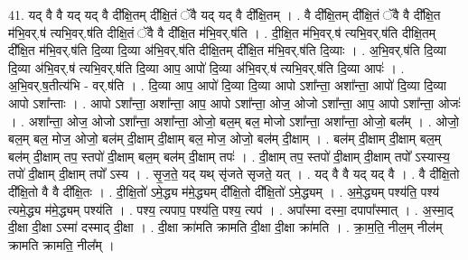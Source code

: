 \documentclass[17pt]{extarticle}
\begin{document}
41. यद् वै वै यद् यद् वै दी᳚क्षि॒तम् दी᳚क्षि॒तं ॅवै यद् यद् वै दी᳚क्षि॒तम् । . वै दी᳚क्षि॒तम् दी᳚क्षि॒तं ॅवै वै दी᳚क्षि॒त म॑भि॒वर्.ष॑ त्यभि॒वर्.ष॑ति दीक्षि॒तं ॅवै वै दी᳚क्षि॒त म॑भि॒वर्.ष॑ति । . दी॒क्षि॒त म॑भि॒वर्.ष॑ त्यभि॒वर्.ष॑ति दीक्षि॒तम् दी᳚क्षि॒त म॑भि॒वर्.ष॑ति दि॒व्या दि॒व्या अ॑भि॒वर्.ष॑ति दीक्षि॒तम् दी᳚क्षि॒त म॑भि॒वर्.ष॑ति दि॒व्याः । . अ॒भि॒वर्.ष॑ति दि॒व्या दि॒व्या अ॑भि॒वर्.ष॑ त्यभि॒वर्.ष॑ति दि॒व्या आप॒ आपो॑ दि॒व्या अ॑भि॒वर्.ष॑ त्यभि॒वर्.ष॑ति दि॒व्या आपः॑ । . अ॒भि॒वर्.ष॒तीत्य॑भि - वर्.ष॑ति । . दि॒व्या आप॒ आपो॑ दि॒व्या दि॒व्या आपो ऽशा᳚न्ता॒ अशा᳚न्ता॒ आपो॑ दि॒व्या दि॒व्या आपो ऽशा᳚न्ताः । . आपो ऽशा᳚न्ता॒ अशा᳚न्ता॒ आप॒ आपो ऽशा᳚न्ता॒ ओज॒ ओजो ऽशा᳚न्ता॒ आप॒ आपो ऽशा᳚न्ता॒ ओजः॑ । . अशा᳚न्ता॒ ओज॒ ओजो ऽशा᳚न्ता॒ अशा᳚न्ता॒ ओजो॒ बल॒म् बल॒ मोजो ऽशा᳚न्ता॒ अशा᳚न्ता॒ ओजो॒ बल᳚म् । . ओजो॒ बल॒म् बल॒ मोज॒ ओजो॒ बल॑म् दी॒क्षाम् दी॒क्षाम् बल॒ मोज॒ ओजो॒ बल॑म् दी॒क्षाम् । . बल॑म् दी॒क्षाम् दी॒क्षाम् बल॒म् बल॑म् दी॒क्षाम् तप॒ स्तपो॑ दी॒क्षाम् बल॒म् बल॑म् दी॒क्षाम् तपः॑ । . दी॒क्षाम् तप॒ स्तपो॑ दी॒क्षाम् दी॒क्षाम् तपो᳚ ऽस्यास्य॒ तपो॑ दी॒क्षाम् दी॒क्षाम् तपो᳚ ऽस्य । . सृ॒ज॒ते॒ यद् यथ् सृ॑जते सृजते॒ यत् । . यद् वै वै यद् यद् वै । . वै दी᳚क्षि॒तो दी᳚क्षि॒तो वै वै दी᳚क्षि॒तः । . दी॒क्षि॒तो॑ ऽमे॒द्ध्य म॑मे॒द्ध्यम् दी᳚क्षि॒तो दी᳚क्षि॒तो॑ ऽमे॒द्ध्यम् । . अ॒मे॒द्ध्यम् पश्य॑ति॒ पश्य॑ त्यमे॒द्ध्य म॑मे॒द्ध्यम् पश्य॑ति । . पश्य॒ त्यपाप॒ पश्य॑ति॒ पश्य॒ त्यप॑ । . अपा᳚स्मा दस्मा॒ दपापा᳚स्मात् । . अ॒स्मा॒द् दी॒क्षा दी॒क्षा ऽस्मा॑ दस्माद् दी॒क्षा । . दी॒क्षा क्रा॑मति क्रामति दी॒क्षा दी॒क्षा क्रा॑मति । . क्रा॒म॒ति॒ नील॒म् नील॑म् क्रामति क्रामति॒ नील᳚म् । \newline
\end{document}
